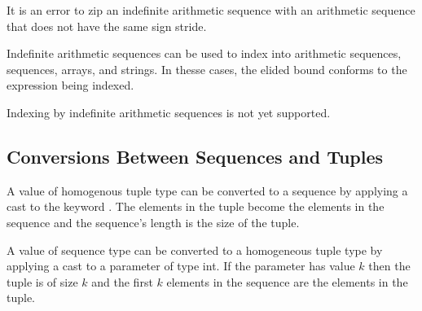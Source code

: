 It is an error to zip an indefinite arithmetic sequence with an
arithmetic sequence that does not have the same sign stride.

Indefinite arithmetic sequences can be used to index into arithmetic
sequences, sequences, arrays, and strings.  In thesse cases, the
elided bound conforms to the expression being indexed.
\begin{implementation}
Indexing by indefinite arithmetic sequences is not yet supported.
\end{implementation}

\subsection{Conversions Between Sequences and Tuples}
\label{Conversions_Between_Sequences_and_Tuples}

A value of homogenous tuple type can be converted to a sequence by
applying a cast to the keyword .  The elements in the tuple
become the elements in the sequence and the sequence's length is the
size of the tuple.

A value of sequence type can be converted to a homogeneous tuple type
by applying a cast to a parameter of type int.  If the parameter has
value $k$ then the tuple is of size $k$ and the first $k$ elements in
the sequence are the elements in the tuple.
